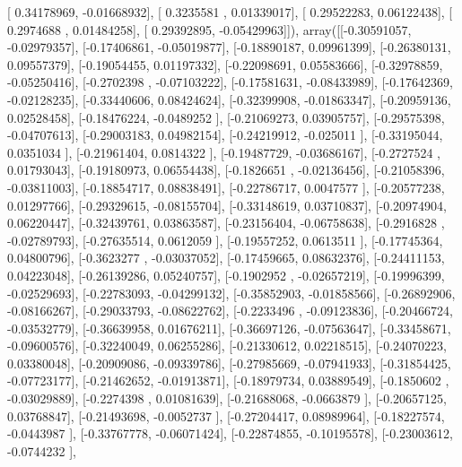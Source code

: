 \documentclass{article}
\begin{document}
       [ 0.34178969, -0.01668932],
       [ 0.3235581 ,  0.01339017],
       [ 0.29522283,  0.06122438],
       [ 0.2974688 ,  0.01484258],
       [ 0.29392895, -0.05429963]]), array([[-0.30591057, -0.02979357],
       [-0.17406861, -0.05019877],
       [-0.18890187,  0.09961399],
       [-0.26380131,  0.09557379],
       [-0.19054455,  0.01197332],
       [-0.22098691,  0.05583666],
       [-0.32978859, -0.05250416],
       [-0.2702398 , -0.07103222],
       [-0.17581631, -0.08433989],
       [-0.17642369, -0.02128235],
       [-0.33440606,  0.08424624],
       [-0.32399908, -0.01863347],
       [-0.20959136,  0.02528458],
       [-0.18476224, -0.0489252 ],
       [-0.21069273,  0.03905757],
       [-0.29575398, -0.04707613],
       [-0.29003183,  0.04982154],
       [-0.24219912, -0.025011  ],
       [-0.33195044,  0.0351034 ],
       [-0.21961404,  0.0814322 ],
       [-0.19487729, -0.03686167],
       [-0.2727524 ,  0.01793043],
       [-0.19180973,  0.06554438],
       [-0.1826651 , -0.02136456],
       [-0.21058396, -0.03811003],
       [-0.18854717,  0.08838491],
       [-0.22786717,  0.0047577 ],
       [-0.20577238,  0.01297766],
       [-0.29329615, -0.08155704],
       [-0.33148619,  0.03710837],
       [-0.20974904,  0.06220447],
       [-0.32439761,  0.03863587],
       [-0.23156404, -0.06758638],
       [-0.2916828 , -0.02789793],
       [-0.27635514,  0.0612059 ],
       [-0.19557252,  0.0613511 ],
       [-0.17745364,  0.04800796],
       [-0.3623277 , -0.03037052],
       [-0.17459665,  0.08632376],
       [-0.24411153,  0.04223048],
       [-0.26139286,  0.05240757],
       [-0.1902952 , -0.02657219],
       [-0.19996399, -0.02529693],
       [-0.22783093, -0.04299132],
       [-0.35852903, -0.01858566],
       [-0.26892906, -0.08166267],
       [-0.29033793, -0.08622762],
       [-0.2233496 , -0.09123836],
       [-0.20466724, -0.03532779],
       [-0.36639958,  0.01676211],
       [-0.36697126, -0.07563647],
       [-0.33458671, -0.09600576],
       [-0.32240049,  0.06255286],
       [-0.21330612,  0.02218515],
       [-0.24070223,  0.03380048],
       [-0.20909086, -0.09339786],
       [-0.27985669, -0.07941933],
       [-0.31854425, -0.07723177],
       [-0.21462652, -0.01913871],
       [-0.18979734,  0.03889549],
       [-0.1850602 , -0.03029889],
       [-0.2274398 ,  0.01081639],
       [-0.21688068, -0.0663879 ],
       [-0.20657125,  0.03768847],
       [-0.21493698, -0.0052737 ],
       [-0.27204417,  0.08989964],
       [-0.18227574, -0.0443987 ],
       [-0.33767778, -0.06071424],
       [-0.22874855, -0.10195578],
       [-0.23003612, -0.0744232 ],
\end{document}
